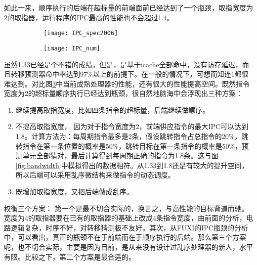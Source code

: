 	如此一来，顺序执行的后端在超标量的前端面前已经达到了一个瓶颈，取指宽度为2的取指器，运行程序的IPC最高的性能也不会超过1.4。
	\begin{figure}[!htbp]
		\centering
	    \begin{subfigure}[b]{\textwidth}
			\texttt{[image: IPC\_spec2006]}
			\caption{}
			\label{fig:ipc_cmp_fig}
		\end{subfigure}
		\begin{subfigure}[b]{\textwidth}
			\texttt{[image: IPC\_num]}
			\caption{}
			\label{fig:ipc_cmp_tbl}
		\end{subfigure}
		\label{fig:ipc_cmp}
	\end{figure}

	虽然1.33已经是个不错的成绩，但是，是基于icache全部命中，没有访存延迟，而且转移预测器命中率达到97\%以上的前提下。在一般的情况下，可想而知连1都很难达到。对比图\ref{fig:ipc_cmp}中当前成熟处理器的性能，还有很大的性能提高空间。既然指令宽度为2的超标量顺序执行已经达到瓶颈，很自然地脑海中会浮现出三种方案：
	\begin{enumerate}[label=(\alph*)]
		\item 继续提高取指宽度，比如四条指令的超标量，后端继续做顺序。
		\item 不提高取指宽度， 因为对于指令宽度为2，前端供应指令的最大IPC可以达到1.8。计算方法为：每周期指令最多是2条，假设跳转指令占总指令的20\%，跳转指令在第一条位置的概率是50\%，跳转目标在第一条指令的概率是50\%，预测单元全部猜对，最后计算得到每周期正确的指令为1.8条。这与图\ref{fig:bandwidth}中模拟得出的数据相符。从1.33到1.8还是有较大的提升空间，所以后端可以采用乱序微结构来做指令的动态调度。
		\item 既增加取指宽度，又把后端做成乱序。
	\end{enumerate}

	权衡三个方案： 第一个是最不切合实际的，换言之，与高性能的目标背道而驰。宽度为4的取指器要在已有的取指器的基础上改成4条指令宽度，由前面的分析，电路逻辑复杂，时序不好，对转移猜测极不友好。其次，从FUXI的IPC瓶颈的分析中，可以看出，真正的瓶颈不在于前端而在于顺序执行的后端。那么第三个方案呢，也不切合实际，主要是因为目前，是从来没有设计过乱序处理器的新人，水平有限。比较之下，第二个方案是最合适的。

